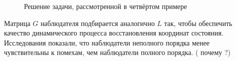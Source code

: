 \documentclass[preprint,russian,a5paper,10pt,twoside,mediummath]{ncc}
\newcommand*{\mysum}[3][]{
	\node[circle,thick,inner sep=0pt,minimum size=2ex] (#3) [#2] {};
	\foreach \i in {#1} {
		\fill[black!50] let \p1 = ($ (#3.east) - (#3.center) $), \n1 = {veclen(\x1,\y1)}, \n2 = { -135 + 90*\i ) } in
			(#3.center) -- ++(\n2:\n1) arc (\n2:{ \n2 + 90 }:\n1) -- cycle;
	}
	\draw[semithick] (#3.north west) -- (#3.south east)
					  (#3.south west) -- (#3.north east);
	\draw[thick] let \p1 = ($ (#3.east) - (#3.center) $), \n1 = {veclen(\x1,\y1)} in (#3.center) circle (\n1);
}
\begin{document}
\begin{figure}[ht]
\footnotesize \caption{Решение задачи, рассмотренной в четвёртом примере\label{fig:extremum:fourth_example}}
\end{figure}

Матрица $G$ наблюдателя подбирается аналогично $L$ так, чтобы обеспечить качество динамического процесса восстановления координат состояния. Исследования показали, что наблюдатели неполного порядка менее чувствительны к помехам, чем наблюдатели полного порядка. ( почему ?)
\\
\end{document}
